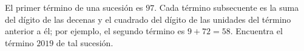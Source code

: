 El primer término de una sucesión es $97$. Cada término subsecuente es la suma del dígito de las decenas y el cuadrado del dígito de las unidades del término anterior a él; por ejemplo, el segundo término es $9 + 72 = 58$. Encuentra el término $2019$ de tal sucesión.
